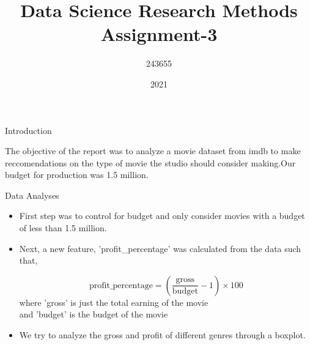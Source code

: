 \documentclass{beamer}
\title{Data Science Research Methods Assignment-3}
\author{243655}
\institute{University of Sussex}
\date{2021}
\begin{document}
\frame{\titlepage}

\begin{frame}{Introduction}

The objective of the report was to analyze a movie dataset from imdb to make reccomendations on the type of movie the studio should consider making.Our budget for production was 1.5 million.

\end{frame}
\begin{frame}{Data Analyses}
\begin{itemize}
    \item First step was to control for budget and only consider movies with a budget of less than 1.5 million.
    \item Next, a new feature, 'profit\_percentage' was calculated from the data such that,\\
    \begin{tcolorbox}[colback=red!5,colframe=green!75!black,title=]
	    $$\text{profit\_percentage}=\left(\frac{\text{gross}}{\text{budget}}-1\right)\times100$$
	    \tcblower
	    where 'gross' is just the total earning of the movie\\
	    and 'budget' is the budget of the movie

\end{tcolorbox} 

    \item We try to analyze the gross and profit of different genres through a boxplot.
	\\[1ex]
\end{itemize}

%
%
%
%


\end{frame}
\end{document}

